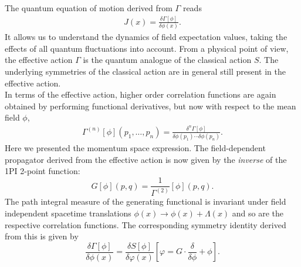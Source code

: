 The quantum equation of motion derived from $\Gamma$ reads
\begin{align}
	J(x) = \frac{\delta\Gamma[\phi]}{\delta\phi(x)}.
	\label{eqn:quantum_eom}
\end{align}
It allows us to understand the dynamics of field expectation values, taking the effects of all quantum fluctuations into account.
From a physical point of view, the effective action $\Gamma$ is the quantum analogue of the classical action $S$. The underlying symmetries of the classical action are in general still present in the effective action.\\
In terms of the effective action, higher order correlation functions are again obtained by performing functional derivatives, but now with respect to the mean field $\phi$,
\begin{align}
	\Gamma^{(n)}[\phi]\left(p_{1}, \ldots, p_{n}\right)=\frac{\delta^{n} \Gamma[\phi]}{\delta \phi\left(p_{1}\right) \cdots \delta \phi\left(p_{n}\right)}.
\end{align}
Here we presented the momentum space expression. The field-dependent propagator derived from the effective action is now given by the \textit{inverse} of the 1PI 2-point function:
\begin{equation}
	G[\phi](p,q) = \frac{1}{\Gamma^{(2)}}[\phi](p,q).
\end{equation}
The path integral measure of the generating functional is invariant under field independent spacetime translations $\phi(x) \rightarrow \phi(x) + \Lambda(x)$ and so are the respective correlation functions. The corresponding symmetry identity derived from this is given by
\begin{equation}
\frac{\delta \Gamma[\phi]}{\delta \phi(x)}=\frac{\delta S[\phi]}{\delta \varphi(x)}\left[\varphi=G \cdot \frac{\delta}{\delta \phi}+\phi\right]. \label{eqn:DSE}
\end{equation}

